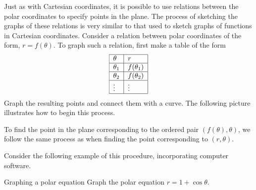 Just as with Cartesian coordinates, it is possible to use
relations between the polar coordinates to specify points in the plane. The
process of sketching the graphs of these relations is very similar to that used to sketch
graphs of functions in Cartesian coordinates. Consider a relation between polar coordinates of the form, $r=f(\theta)$. To graph such a relation, first make a table of
the form 
\begin{equation*}
\begin{tabular}{|l|l|}
\hline
$\theta $ & $r$ \\ \hline
$\theta _{1}$ & $f(\theta _{1}) $ \\ \hline
$\theta _{2}$ & $f(\theta _{2}) $ \\ \hline
$\vdots $ & $\vdots $ \\ \hline
\end{tabular}
\end{equation*}
Graph the resulting points and connect them with a curve. The
following picture illustrates how to begin this process.

\begin{center}
\end{center}

To find the point in the plane corresponding to the ordered pair $(f(
\theta) ,\theta)$, we follow the same process as when finding the point corresponding to $(r, \theta)$.

Consider the following example of this procedure, incorporating computer software.

\begin{example}{Graphing a polar equation}{}
Graph the polar equation $r=1+\cos \theta$.
\end{example}

